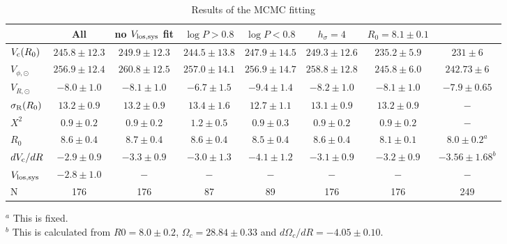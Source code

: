 \documentclass[11pt,a4paper]{article}
\begin{document}
\begin{landscape}
\begin{table}
 \caption{Results of the MCMC fitting}
 \label{tab:MCMC-res}
 \begin{tabular}{lccccccc }
  \hline
                                        & All                 &  no $V_{\rm los,sys}$ fit & $\log P>0.8$ & $\log P<0.8$ & $h_{\sigma}=4$ & $R_0=8.1\pm0.1$ &  \citet{vvb17a} \\
 \hline
 $V_{\rm c}(R_0)$            & $245.8\pm  12.3$ & $249.9\pm  12.3$ & $244.5\pm  13.8$ & $247.9\pm  14.5$ & $249.3\pm  12.6$
  & $235.2\pm   5.9$ & $231\pm6$ \\
 
 $V_{\phi,\odot}$              & $256.9\pm  12.4$ & $260.8\pm  12.5$ & $257.0\pm  14.1$ & $256.9\pm  14.7$ & $258.8\pm  12.8$ 
  & $245.8\pm   6.0$ & $242.73\pm6$\\

 $V_{R,\odot}$                 & $ -8.0\pm   1.0$    & $ -8.1\pm   1.0$    & $ -6.7\pm   1.5$ & $ -9.4\pm   1.4$ &  $ -8.2\pm   1.0$ 
  & $ -8.1\pm   1.0$ & $-7.9\pm0.65$ \\

 $\sigma_{\rm R}(R_0)$   & $ 13.2\pm   0.9$   & $ 13.2\pm   0.9$   & $ 13.4\pm   1.6$ & $ 12.7\pm   1.1$ & $ 13.1\pm   0.9$ 
  & $ 13.2\pm   0.9$ & $-$ \\

 $X^2$                             & $  0.9\pm   0.2$   & $  0.9\pm   0.2$    &   $  1.2\pm   0.5$ & $  0.9\pm   0.3$ & $  0.9\pm   0.2$ 
   & $  0.9\pm   0.2$ & $-$ \\

 $R_0$                             &  $  8.6\pm   0.4$    & $  8.7\pm   0.4$    & $  8.6\pm   0.4$ & $  8.5\pm   0.4$ & $  8.6\pm   0.4$ 
   &  $  8.1\pm   0.1$ & $8.0\pm0.2^{a}$ \\
  
 $dV_{\rm c}/dR$     & $ -2.9\pm   0.9$    & $ -3.3\pm   0.9$   & $ -3.0\pm   1.3$ & $ -4.1\pm   1.2$ & $ -3.1\pm   0.9$ 
   & $ -3.2\pm   0.9$ & $-3.56\pm1.68^{b}$ \\

 $V_{\rm los,sys}$            & $ -2.8\pm   1.0$    & $-$                       &  $-$                       &  $-$                   &   $-$  
   &  $-$ &  $-$ \\ 

 N                                      & 176                       & 176                     &  87                         & 89  & 176
  & 176 &  249 \\
 
\hline
\end{tabular}

$^{a}$ This is fixed.\\
$^{b}$ This is calculated from $R0=8.0\pm0.2$, $\Omega_c=28.84\pm0.33$ and $d\Omega_c/dR=-4.05\pm0.10$.
\end{table}
\end{landscape}
\end{document}
